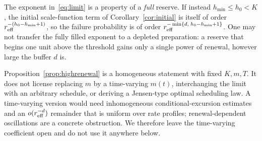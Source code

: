 \begin{remark}\label{rem:depleted}
The exponent in~\eqref{eq:limit} is a property of a \emph{full} reserve. If instead $h_{\min}\le h_0<K$, the initial scale-function term of Corollary~\ref{cor:initial} is itself of order $r_{\mathrm{eff}}^{-(h_0-h_{\min}+1)}$, so the failure probability is of order $r_{\mathrm{eff}}^{-\min\{d,\;h_0-h_{\min}+1\}}$. One may not transfer the fully filled exponent to a depleted preparation: a reserve that begins one unit above the threshold gains only a single power of renewal, however large the buffer $d$ is.
\end{remark}

\begin{remark}\label{rem:notclaimed}
Proposition~\ref{prop:highrenewal} is a homogeneous statement with fixed $K,m,T$. It does not license replacing $m$ by a time-varying $m(t)$, interchanging the limit with an arbitrary schedule, or deriving a Jensen-type optimal scheduling law. A time-varying version would need inhomogeneous conditional-excursion estimates and an $o(r_{\mathrm{eff}}^{-d})$ remainder that is uniform over rate profiles; renewal-dependent oscillations are a concrete obstruction. We therefore leave the time-varying coefficient open and do not use it anywhere below.
\end{remark}
